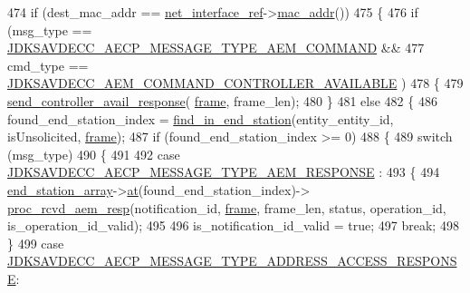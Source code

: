 \begin{DoxyCode}
{474             \textcolor{keywordflow}{if} (dest\_mac\_addr == \hyperlink{namespaceavdecc__lib_adb4da03bc65b7846cc240ee919bbde19}{net\_interface\_ref}->\hyperlink{classavdecc__lib_1_1net__interface__imp_a742e975c065f9067f42182847df080da}{mac\_addr}())
475             \{
476                 \textcolor{keywordflow}{if} (msg\_type == \hyperlink{group__aecp__message__type_ga4625ce189cc209f42deb0629f48faf69}{JDKSAVDECC\_AECP\_MESSAGE\_TYPE\_AEM\_COMMAND}
       &&
477                     cmd\_type == \hyperlink{group__command_ga742fafae5e26884f3caac94dcc6c2814}{JDKSAVDECC\_AEM\_COMMAND\_CONTROLLER\_AVAILABLE}
      )
478                 \{
479                     \hyperlink{classavdecc__lib_1_1controller__imp_ab0133295fa2700fa61a18663628a5328}{send\_controller\_avail\_response}(
      \hyperlink{gst__avb__playbin_8c_ac8e710e0b5e994c0545d75d69868c6f0}{frame}, frame\_len);
480                 \}
481                 \textcolor{keywordflow}{else}
482                 \{
486                     found\_end\_station\_index = \hyperlink{classavdecc__lib_1_1controller__imp_a9a0d332a5f7f7d1b006f83be7a9ee5e0}{find\_in\_end\_station}(entity\_entity\_id, 
      isUnsolicited, \hyperlink{gst__avb__playbin_8c_ac8e710e0b5e994c0545d75d69868c6f0}{frame});
487                     \textcolor{keywordflow}{if} (found\_end\_station\_index >= 0)
488                     \{
489                         \textcolor{keywordflow}{switch} (msg\_type)
490                         \{
491 
492                         \textcolor{keywordflow}{case} \hyperlink{group__aecp__message__type_ga9cad401e0f60634a8f084d93b0374d31}{JDKSAVDECC\_AECP\_MESSAGE\_TYPE\_AEM\_RESPONSE}
      :
493                         \{
494                             \hyperlink{classavdecc__lib_1_1controller__imp_a17c6518dbb728acdcd1c4e78d7bc1c5a}{end\_station\_array}->\hyperlink{classavdecc__lib_1_1end__stations_a8b2053474417f106d063017c5b60bad2}{at}(found\_end\_station\_index)->
      \hyperlink{classavdecc__lib_1_1end__station__imp_a8b24d9b5507eefd727584df0076704a5}{proc\_rcvd\_aem\_resp}(notification\_id, \hyperlink{gst__avb__playbin_8c_ac8e710e0b5e994c0545d75d69868c6f0}{frame}, frame\_len, status, operation\_id, 
      is\_operation\_id\_valid);
495 
496                             is\_notification\_id\_valid = \textcolor{keyword}{true};
497                             \textcolor{keywordflow}{break};
498                         \}
499                         \textcolor{keywordflow}{case} 
      \hyperlink{group__aecp__message__type_ga4d8df21361c95f23016e03d0ef625dc0}{JDKSAVDECC\_AECP\_MESSAGE\_TYPE\_ADDRESS\_ACCESS\_RESPONSE}:
}
\end{DoxyCode}
